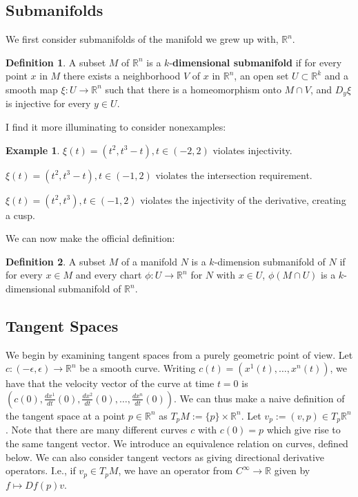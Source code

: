 \documentclass{article}
\theoremstyle{definition}
\newtheorem{ex}{Example}[section]
\newtheorem{defn}{Definition}[section]
\newcommand{\R}{\mathbb{R}}
\begin{document}
\subsection{Submanifolds}
We first consider submanifolds of the manifold we grew up with, $\R^{n}.$ \begin{defn}
A subset $M$ of $\R^{n}$ is a $k$-\textbf{dimensional submanifold} if for every point $x$ in $M$ there exists a neighborhood $V$ of $x$ in $\R^{n}$, an open set $U\subset\R^{k}$ and a smooth map $\xi:U\rightarrow\R^{n}$ such that there is a homeomorphism onto $M\cap V$, and $D_{y}\xi$ is injective for every $y\in U$.
\end{defn}

I find it more illuminating to consider nonexamples:
\begin{ex}
$\xi(t)=(t^{2},t^{3}-t),t\in(-2,2)$ violates injectivity.

$\xi(t)=(t^{2},t^{3}-t),t\in(-1,2)$ violates the intersection requirement.

$\xi(t)=(t^{2},t^{3}),t\in(-1,2)$ violates the injectivity of the derivative, creating a cusp.
\end{ex}
We can now make the official definition:
\begin{defn}
A subset $M$ of a manifold $N$ is a $k$-dimension submanifold of $N$ if for every $x\in M$ and every chart $\phi:U\rightarrow \R^{n}$ for $N$ with $x\in U$, $\phi(M\cap U)$ is a $k$-dimensional submanifold of $\R^{n}$.
\end{defn}
\subsection{Tangent Spaces}
We begin by examining tangent spaces from a purely geometric point of view.
Let $c:(-\epsilon,\epsilon)\rightarrow \R^{n}$ be a smooth curve. Writing $c(t)=(x^{1}(t),\dots,x^{n}(t))$, we have that the velocity vector of the curve at time $t=0$ is $(c(0),\frac{dx^{1}}{dt}(0),\frac{dx^{2}}{dt}(0),\dots,\frac{dx^{n}}{dt}(0))$. We can thus make a naive definition of the tangent space at a point $p\in\R^{n}$ as $T_{p}M:=\{p\}\times\R^{n}.$ Let $v_{p}:=(v,p)\in T_{p}\R^{n}$. Note that there are many different curves $c$ with $c(0)=p$ which give rise to the same tangent vector. We introduce an equivalence relation on curves, defined below. We can also consider tangent vectors as giving directional derivative operators. I.e., if $v_{p}\in T_{p} M$, we have an operator from $C^{\infty}\rightarrow\R$ given by $f\mapsto Df(p)v$. 
\end{document}

